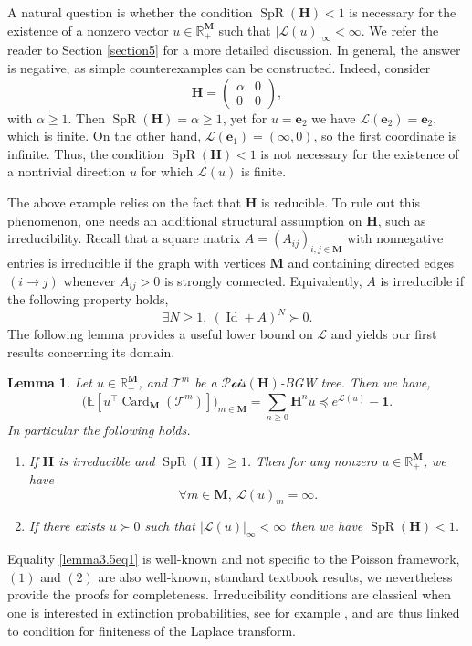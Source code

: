 \documentclass[reqno,final,11pt]{amsart}
\renewcommand{\cite}{\citet}
\theoremstyle{plain}
\newtheorem{lemma}[theorem]{Lemma}
\theoremstyle{definition}
\theoremstyle{remark}
\newcommand{\R}{\mathds{R}}
\newcommand{\E}[1]{\mathds{E}\left[#1\right]}
\newcommand{\M}{\bm{M}}
\newcommand{\T}{\mathcal{T}}
\renewcommand{\L}{\bm{\mathscr{L}}}
\newcommand{\ones}{\bm{1}}
\newcommand{\e}{\bm{e}}
\renewcommand{\H}{\bm{H}}
\newcommand{\pos}{\R_+^{\M}}
\newcommand{\Pois}{\mathscr{P}\!\mathscr{o}\!\mathscr{i}\!\mathscr{s}}
\newcommand{\trp}{^{\intercal}}
\DeclareMathOperator{\card}{Card}
\DeclareMathOperator{\spr}{SpR}
\DeclareMathOperator{\Id}{Id}
\begin{document}
A natural question is whether the condition $\spr(\H)<1$ is necessary for the existence of a nonzero vector $u\in\pos$ such that $\vert\L(u)\vert_{\infty}<\infty$. We refer the reader to Section \ref{section5} for a more detailed discussion. In general, the answer is negative, as simple counterexamples can be constructed. Indeed, consider
\[\H= \begin{pmatrix} \alpha & 0 \\ 0 & 0 \end{pmatrix},\]
with $\alpha\geq 1$. Then $\spr(\H)=\alpha\geq 1$, yet for $u=\e_2$ we have $\L(\e_2)=\e_2$, which is finite. On the other hand, $\L(\e_1)=(\infty,0)$, so the first coordinate is infinite. Thus, the condition $\spr(\H)<1$ is not necessary for the existence of a nontrivial direction $u$ for which $\L(u)$ is finite.

The above example relies on the fact that $\H$ is reducible. To rule out this phenomenon, one needs an additional structural assumption on $\H$, such as irreducibility. Recall that a square matrix $A = (A_{ij})_{i,j\in \M}$ with nonnegative entries is irreducible if the graph with vertices $\M$ and containing directed edges $(i \rightarrow j)$ whenever $A_{ij} > 0$ is strongly connected. Equivalently, $A$ is irreducible if the following property holds,
\[\exists N\geq1, \ (\Id+A)^N \succ 0.\]
The following lemma provides a useful lower bound on $\L$ and yields our first results concerning its domain.

\begin{lemma}\label{lemma3.5}
	Let $u\in\pos$, and $\T^m$ be a $\Pois(\H)$-BGW tree. Then we have,
	\begin{equation}\label{lemma3.5eq1}
		\Big( \E{u\trp \card_{\M}(\T^m)} \Big)_{m\in\M} = \sum_{n\geq 0} \H^n u \preceq e^{\L(u)} - \ones.
	\end{equation}
	In particular the following holds.
	\begin{enumerate}
		\item If $\H$ is irreducible and $\spr(\H) \geq 1$. Then for any nonzero $u\in\pos$, we have
	\[ \forall m\in\M, \ \L(u)_m = \infty.\]
		\item If there exists $u\succ 0$ such that $\vert \L(u) \vert_{\infty}<\infty $ then we have $\spr(\H)<1$.
	\end{enumerate}
\end{lemma}

Equality \eqref{lemma3.5eq1} is well-known and not specific to the Poisson framework, $(1)$ and $(2)$ are also well-known, standard textbook results, we nevertheless provide the proofs for completeness. Irreducibility conditions are classical when one is interested in extinction probabilities, see for example \cite{harris_theory_1963}, and are thus linked to condition for finiteness of the Laplace transform.
\end{document}
